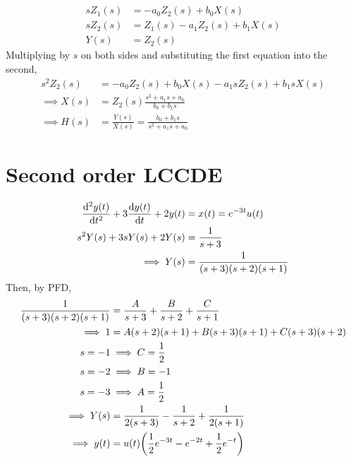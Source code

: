 \documentclass{article}
\begin{document}
\subsection{}

\begin{align}
    s Z_1(s) &= -a_0 Z_2(s) + b_0 X(s) \\
    s Z_2(s) &= Z_1(s) - a_1 Z_2(s) + b_1 X(s) \\
    Y(s) &= Z_2(s)
\end{align}
Multiplying by \(s\) on both sides and substituting the first equation into the second,
\begin{align}
    s^2 Z_2(s) &= -a_0 Z_2(s) + b_0 X(s) - a_1 s Z_2(s) + b_1 s X(s) \\
    \implies X(s) &= Z_2(s) \frac{s^2 + a_1 s + a_0}{b_0 + b_1 s} \\
    \implies H(s) &= \frac{Y(s)}{X(s)} = \frac{b_0 + b_1 s}{s^2 + a_1 s + a_0}
\end{align}

\section{Second order LCCDE}

\begin{align}
    \dv[2]{y(t)}{t} + 3 \dv{y(t)}{t} + 2y(t) &= x(t) = e^{-3t} u(t) \\
    s^2 Y(s) + 3 s Y(s) + 2Y(s) &= \frac{1}{s + 3} \\
    \implies Y(s) &= \frac{1}{(s + 3) (s + 2) (s + 1)}
\end{align}
Then, by PFD,
\begin{align}
    \frac{1}{(s + 3) (s + 2) (s + 1)} &= \frac{A}{s + 3} + \frac{B}{s + 2} + \frac{C}{s + 1} \\
    \implies 1 &= A (s + 2) (s + 1) + B (s + 3) (s + 1) + C (s + 3) (s + 2) \\
    s = -1 &\implies C = \frac{1}{2} \\
    s = -2 &\implies B = -1 \\
    s = -3 &\implies A = \frac{1}{2} \\
    \implies Y(s) &= \frac{1}{2 (s + 3)} - \frac{1}{s + 2} + \frac{1}{2 (s + 1)} \\
    \implies y(t) &= u(t) \qty(\frac{1}{2} e^{-3t} - e^{-2t} + \frac{1}{2} e^{-t})
\end{align}
\end{document}
